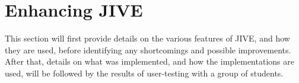 \section{Enhancing JIVE}\label{jiveEnhance}

This section will first provide details on the various features of JIVE, and how they are used, before identifying any shortcomings and possible improvements.
After that, details on what was implemented, and how the implementations are used, will be followed by the results of user-testing with a group of students.







